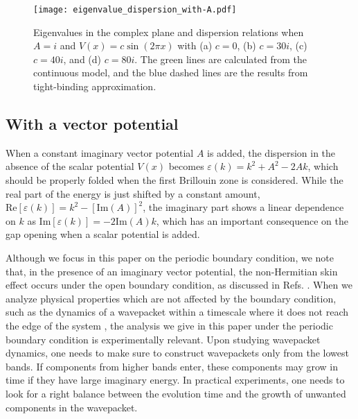 \documentclass[prb,superscriptaddress,floatfix,twocolumn,showpacs]{revtex4-2}
\begin{document}
\begin{figure*}
    \centering
    \texttt{[image: eigenvalue\_dispersion\_with-A.pdf]}
    \caption{Eigenvalues in the complex plane and dispersion relations when $A=i$ and $V(x) = c \sin (2\pi x)$ with (a) $c=0$, (b) $c=30i$, (c) $c=40i$, and (d) $c=80i$. 
    The green lines are calculated from the continuous model, and the blue dashed lines are the results from tight-binding approximation.}
    \label{fig:eigenvalue_dispersion_with-A}
\end{figure*}


\subsection{With a vector potential}
\label{subsec:nearly-free_with-A}

When a constant imaginary vector potential $A$ is added, the dispersion in the absence of the scalar potential $V(x)$ becomes $\varepsilon(k) = k^2 + A^2 - 2Ak$, which should be properly folded when the first Brillouin zone is considered. While the real part of the energy is just shifted by a constant amount, $\mathrm{Re}[\varepsilon(k)] = k^2-[\mathrm{Im}(A)]^2$, the imaginary part shows a linear dependence on $k$ as $\mathrm{Im}[\varepsilon(k)] = -2\mathrm{Im}(A)k$, which has an important consequence on the gap opening when a scalar potential is added.

Although we focus in this paper on the periodic boundary condition, we note that, in the presence of an imaginary vector potential, the non-Hermitian skin effect occurs under the open boundary condition, as discussed in Refs. \cite{longhi2021non, yokomizo2021non}. 
When we analyze physical properties which are not affected by the boundary condition, such as the dynamics of a wavepacket within a timescale where it does not reach the edge of the system \cite{mao2021boundary}, the analysis we give in this paper under the periodic boundary condition is experimentally relevant.
Upon studying wavepacket dynamics, one needs to make sure to construct wavepackets only from the lowest bands. If components from higher bands enter, these components may grow in time if they have large imaginary energy. In practical experiments, one needs to look for a right balance between the evolution time and the growth of unwanted components in the wavepacket.
\end{document}

